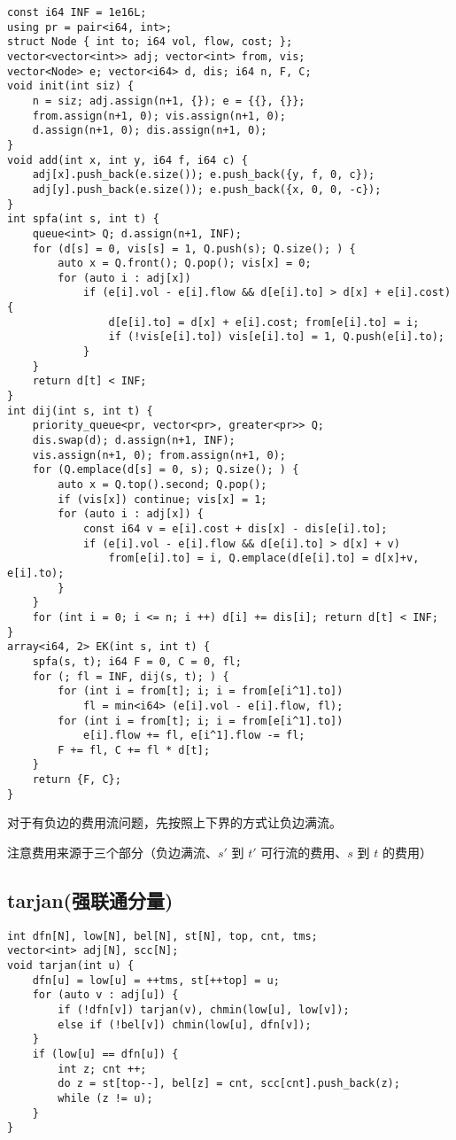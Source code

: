 \documentclass[a4paper,landscape,twocolumn]{ctexart}
\begin{document}
\begin{lstlisting}
const i64 INF = 1e16L;
using pr = pair<i64, int>;
struct Node { int to; i64 vol, flow, cost; };
vector<vector<int>> adj; vector<int> from, vis;
vector<Node> e; vector<i64> d, dis; i64 n, F, C;
void init(int siz) {
	n = siz; adj.assign(n+1, {}); e = {{}, {}};
	from.assign(n+1, 0); vis.assign(n+1, 0);
	d.assign(n+1, 0); dis.assign(n+1, 0);
}
void add(int x, int y, i64 f, i64 c) {
	adj[x].push_back(e.size()); e.push_back({y, f, 0, c});
	adj[y].push_back(e.size()); e.push_back({x, 0, 0, -c});
}
int spfa(int s, int t) {
	queue<int> Q; d.assign(n+1, INF);
	for (d[s] = 0, vis[s] = 1, Q.push(s); Q.size(); ) {
		auto x = Q.front(); Q.pop(); vis[x] = 0;
		for (auto i : adj[x])
			if (e[i].vol - e[i].flow && d[e[i].to] > d[x] + e[i].cost) {
				d[e[i].to] = d[x] + e[i].cost; from[e[i].to] = i;
				if (!vis[e[i].to]) vis[e[i].to] = 1, Q.push(e[i].to);
			}
	}
	return d[t] < INF;
} 
int dij(int s, int t) {
	priority_queue<pr, vector<pr>, greater<pr>> Q;
	dis.swap(d); d.assign(n+1, INF);
	vis.assign(n+1, 0); from.assign(n+1, 0);
	for (Q.emplace(d[s] = 0, s); Q.size(); ) {
		auto x = Q.top().second; Q.pop();
		if (vis[x]) continue; vis[x] = 1;
		for (auto i : adj[x]) {
			const i64 v = e[i].cost + dis[x] - dis[e[i].to];
			if (e[i].vol - e[i].flow && d[e[i].to] > d[x] + v)
				from[e[i].to] = i, Q.emplace(d[e[i].to] = d[x]+v, e[i].to);
		}
	}
	for (int i = 0; i <= n; i ++) d[i] += dis[i]; return d[t] < INF;
}
array<i64, 2> EK(int s, int t) {
	spfa(s, t); i64 F = 0, C = 0, fl;
	for (; fl = INF, dij(s, t); ) {
		for (int i = from[t]; i; i = from[e[i^1].to])
			fl = min<i64> (e[i].vol - e[i].flow, fl);
		for (int i = from[t]; i; i = from[e[i^1].to])
			e[i].flow += fl, e[i^1].flow -= fl;
		F += fl, C += fl * d[t];
	}
	return {F, C};
}
\end{lstlisting}

对于有负边的费用流问题，先按照上下界的方式让负边满流。

注意费用来源于三个部分（负边满流、$s'$ 到 $t'$ 可行流的费用、$s$ 到 $t$ 的费用）

\subsection{tarjan(强联通分量)}

\begin{lstlisting}
int dfn[N], low[N], bel[N], st[N], top, cnt, tms;
vector<int> adj[N], scc[N];
void tarjan(int u) {
	dfn[u] = low[u] = ++tms, st[++top] = u;
	for (auto v : adj[u]) {
		if (!dfn[v]) tarjan(v), chmin(low[u], low[v]);
		else if (!bel[v]) chmin(low[u], dfn[v]);
	}
	if (low[u] == dfn[u]) {
		int z; cnt ++;
		do z = st[top--], bel[z] = cnt, scc[cnt].push_back(z);
		while (z != u);
	}
}
\end{lstlisting}
\end{document}

